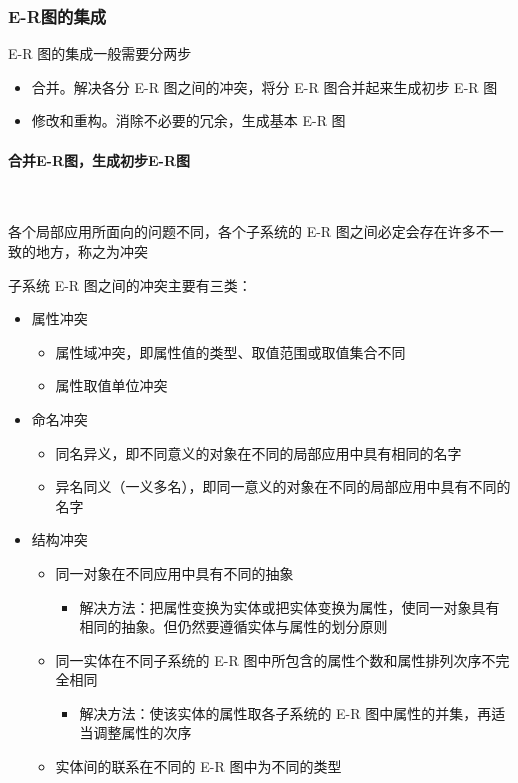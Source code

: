 \subsubsection{E-R图的集成}
E-R 图的集成一般需要分两步
\begin{itemize}
    \item 合并。解决各分 E-R 图之间的冲突，将分 E-R 图合并起来生成初步 E-R 图
    \item 修改和重构。消除不必要的冗余，生成基本 E-R 图
\end{itemize}

\paragraph*{合并E-R图，生成初步E-R图}~{}

各个局部应用所面向的问题不同，各个子系统的 E-R 图之间必定会存在许多不一致的地方，称之为冲突

子系统 E-R 图之间的冲突主要有三类：
\begin{itemize}
    \item 属性冲突
    \begin{itemize}
        \item 属性域冲突，即属性值的类型、取值范围或取值集合不同
        \item 属性取值单位冲突
    \end{itemize}
    \item 命名冲突
    \begin{itemize}
        \item 同名异义，即不同意义的对象在不同的局部应用中具有相同的名字
        \item 异名同义（一义多名），即同一意义的对象在不同的局部应用中具有不同的名字    
    \end{itemize}
    \item 结构冲突
    \begin{itemize}
        \item 同一对象在不同应用中具有不同的抽象
        \begin{itemize}
            \item 解决方法：把属性变换为实体或把实体变换为属性，使同一对象具有相同的抽象。但仍然要遵循实体与属性的划分原则
        \end{itemize}
        \item 同一实体在不同子系统的 E-R 图中所包含的属性个数和属性排列次序不完全相同
        \begin{itemize}
            \item 解决方法：使该实体的属性取各子系统的 E-R 图中属性的并集，再适当调整属性的次序
        \end{itemize}
        \item 实体间的联系在不同的 E-R 图中为不同的类型
    \end{itemize}
\end{itemize}

